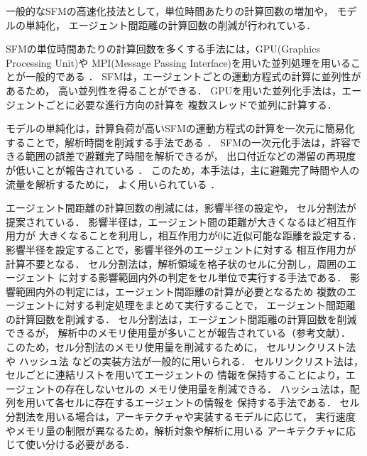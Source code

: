 一般的なSFMの高速化技法として，単位時間あたりの計算回数の増加や，
モデルの単純化，
エージェント間距離の計算回数の削減が行われている．

SFMの単位時間あたりの計算回数を多くする手法には，GPU(Graphics Processing Unit)や
MPI(Message Passing Interface)を用いた並列処理を用いることが一般的である
\cite{seru_sfm1}\cite{seru_sfm2}
\cite{sfm_gpu1}\cite{sfm_gpu2}\cite{sfm_gpu3}\cite{sfm_gpu4}．
\cite{mpi1}\cite{mpi2}
SFMは，エージェントごとの運動方程式の計算に並列性があるため，
高い並列性を得ることができる．
GPUを用いた並列化手法は，エージェントごとに必要な進行方向の計算を
複数スレッドで並列に計算する．

モデルの単純化は，計算負荷が高いSFMの運動方程式の計算を一次元に簡易化
することで，解析時間を削減する手法である
\cite{1jigen_model}\cite{1jigen_model1}\cite{1jigen_model2}．
SFMの一次元化手法は，許容できる範囲の誤差で避難完了時間を解析できるが，
出口付近などの滞留の再現度が低いことが報告されている
\cite{1jigen_model2}．
このため，本手法は，主に避難完了時間や人の流量を解析するために，
よく用いられている
\cite{1jigen_katuyou}\cite{1jigen_model_ev1}\cite{1jigen_model_ev2}．

エージェント間距離の計算回数の削減には，影響半径の設定や，
セル分割法が提案されている\cite{cell1}\cite{cell2}．
影響半径は，エージェント間の距離が大きくなるほど相互作用力が
大きくなることを利用し，相互作用力が0に近似可能な距離を設定する．
影響半径を設定することで，影響半径外のエージェントに対する
相互作用力が計算不要となる\cite{eikyo_space}．
セル分割法は，解析領域を格子状のセルに分割し，周囲のエージェント
に対する影響範囲内外の判定をセル単位で実行する手法である．
影響範囲内外の判定には，エージェント間距離の計算が必要となるため
複数のエージェントに対する判定処理をまとめて実行することで，
エージェント間距離の計算回数を削減する．
セル分割法は，エージェント間距離の計算回数を削減できるが，
解析中のメモリ使用量が多いことが報告されている（参考文献）．
このため，セル分割法のメモリ使用量を削減するために，
セルリンクリスト法\cite{cell_book1}\cite{cell_book}\cite{cellrenketu}
や
ハッシュ法\cite{hash}
などの実装方法が一般的に用いられる．
セルリンクリスト法は，セルごとに連結リストを用いてエージェントの
情報を保持することにより，エージェントの存在しないセルの
メモリ使用量を削減できる．
ハッシュ法は，配列を用いて各セルに存在するエージェントの情報を
保持する手法である．
セル分割法を用いる場合は，アーキテクチャや実装するモデルに応じて，
実行速度やメモリ量の制限が異なるため，解析対象や解析に用いる
アーキテクチャに応じて使い分ける必要がある．


